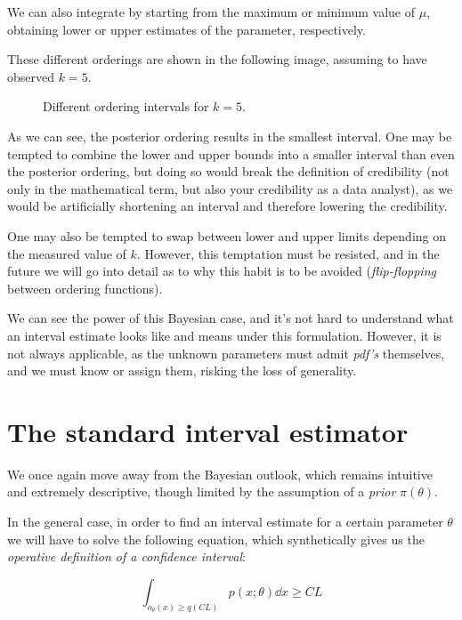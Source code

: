 \begin{example}
	We can also integrate by starting from the maximum or minimum value of $\mu$, obtaining lower or upper estimates of the parameter, respectively. 
	
	These different orderings are shown in the following image, assuming to have observed $k=5$.
	
	\begin{figure}[H]
		\centering
		
		\caption{Different ordering intervals for $k=5$.}
		\label{fig:bayes_interval}
	\end{figure}
	
	
	
	As we can see, the posterior ordering results in the smallest interval. One may be tempted to combine the lower and upper bounds into a smaller interval than even the posterior ordering, but doing so would break the definition of credibility (not only in the mathematical term, but also your credibility as a data analyst), as we would be artificially shortening an interval and therefore lowering the credibility.
	
	One may also be tempted to swap between lower and upper limits depending on the measured value of $k$. However, this temptation must be resisted, and in the future we will go into detail as to why this habit is to be avoided (\emph{flip-flopping} between ordering functions).
\end{example}

We can see the power of this Bayesian case, and it's not hard to understand what an interval estimate looks like and means under this formulation. However, it is not always applicable, as the unknown parameters must admit \emph{pdf's} themselves, and we must know or assign them, risking the loss of generality.

\section{The standard interval estimator}

We once again move away from the Bayesian outlook, which remains intuitive and extremely descriptive, though limited by the assumption of a \emph{prior} $\pi(\theta)$.

In the general case, in order to find an interval estimate for a certain parameter $\theta$ we will have to solve the following equation, which synthetically gives us the \emph{operative definition of a confidence interval}:

\begin{equation}
	\int_{o_{\theta}(x)\geq q(CL)} p(x;\theta)\dd x \geq CL
	\label{eq:int_definition}
\end{equation}

